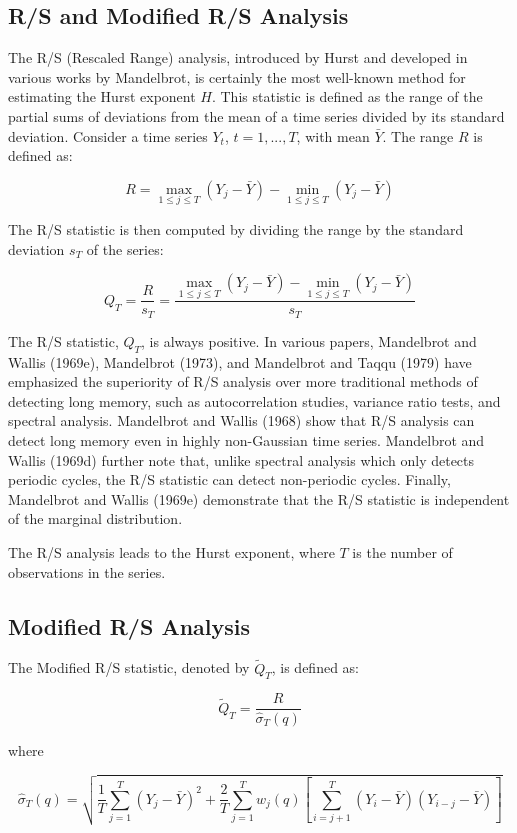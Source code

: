 \documentclass[11pt]{extarticle}
\begin{document}
\subsection{R/S and Modified R/S Analysis}
The R/S (Rescaled Range) analysis, introduced by Hurst and developed in various works by Mandelbrot, is certainly the most well-known method for estimating the Hurst exponent $H$. This statistic is defined as the range of the partial sums of deviations from the mean of a time series divided by its standard deviation. Consider a time series $Y_t$, $t = 1, ..., T$, with mean $\bar{Y}$. The range $R$ is defined as:

\[
R = \max_{1 \leq j \leq T} \left( Y_j - \bar{Y} \right) - \min_{1 \leq j \leq T} \left( Y_j - \bar{Y} \right)
\]

The R/S statistic is then computed by dividing the range by the standard deviation $s_T$ of the series:

\[
Q_T = \frac{R}{s_T} = \frac{\max_{1 \leq j \leq T} \left( Y_j - \bar{Y} \right) - \min_{1 \leq j \leq T} \left( Y_j - \bar{Y} \right)}{s_T}
\]

The R/S statistic, $Q_T$, is always positive. In various papers, Mandelbrot and Wallis (1969e), Mandelbrot (1973), and Mandelbrot and Taqqu (1979) have emphasized the superiority of R/S analysis over more traditional methods of detecting long memory, such as autocorrelation studies, variance ratio tests, and spectral analysis. Mandelbrot and Wallis (1968) show that R/S analysis can detect long memory even in highly non-Gaussian time series. Mandelbrot and Wallis (1969d) further note that, unlike spectral analysis which only detects periodic cycles, the R/S statistic can detect non-periodic cycles. Finally, Mandelbrot and Wallis (1969e) demonstrate that the R/S statistic is independent of the marginal distribution.

The R/S analysis leads to the Hurst exponent, where $T$ is the number of observations in the series.

\subsection{Modified R/S Analysis}
The Modified R/S statistic, denoted by $\tilde{Q}_T$, is defined as:

\[
\tilde{Q}_T = \frac{R}{\hat{\sigma}_T(q)}
\]

where

\[
\hat{\sigma}_T(q) = \sqrt{\frac{1}{T} \sum_{j=1}^{T} (Y_j - \bar{Y})^2 + \frac{2}{T} \sum_{j=1}^{T} w_j(q) \left[ \sum_{i=j+1}^{T} (Y_i - \bar{Y})(Y_{i-j} - \bar{Y}) \right]}
\]
\end{document}
